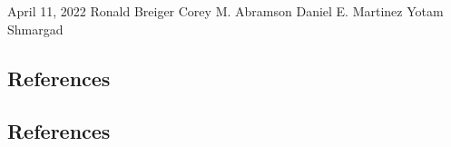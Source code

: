 \documentclass[dissertation, figuresright]{uathesis}
\begin{document}

\approval
{April 11, 2022}		%
{Ronald Breiger}	%
{Corey M. Abramson}	    %
{Daniel E. Martinez}	%
{Yotam Shmargad}		%
{}



\tableofcontents

\listoffigures

\listoftables


\begin{refsection} %

\newpage
\section{References}
\begin{singlespace}
\printbibliography[heading=none] %
\end{singlespace}
\end{refsection}

\appendix

\begin{refsection} %

\newpage
\section{References}
\begin{singlespace}
\printbibliography[heading=none] %
\end{singlespace}
\end{refsection}
\end{document}
